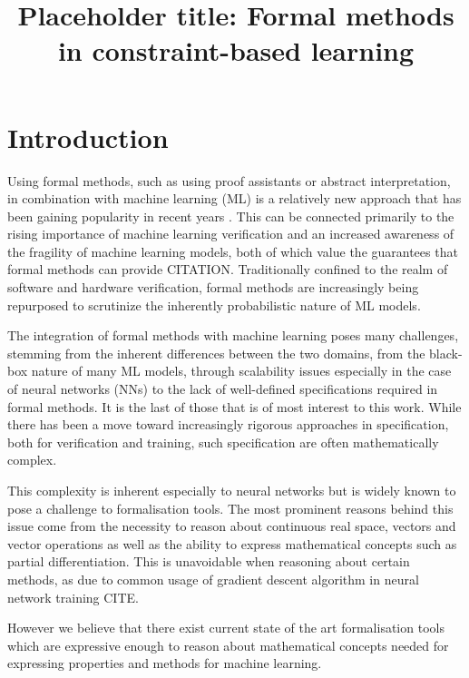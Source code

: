\documentclass[a4paper,10pt]{article}
\title{Placeholder title: Formal methods in constraint-based learning}
\author{}
\begin{document}
\maketitle

\begin{abstract}
\end{abstract}

\section{Introduction}

Using formal methods, such as using proof assistants or abstract interpretation, in combination with machine learning (ML) is a relatively new approach that has been gaining popularity in recent years \cite{urban2021review,9842406}. 
This can be connected primarily to the rising importance of machine learning verification and an increased awareness of the fragility of machine learning models, both of which value the guarantees that formal methods can provide CITATION.
Traditionally confined to the realm of software and hardware verification, formal methods are increasingly being repurposed to scrutinize the inherently probabilistic nature of ML models.

The integration of formal methods with machine learning poses many challenges, stemming from the inherent differences between the two domains, from the black-box nature of many ML models, through scalability issues especially in the case of neural networks (NNs) to the lack of well-defined specifications required in formal methods. It is the last of those that is of most interest to this work. While there has been a move toward increasingly rigorous approaches in specification, both for verification and training, such specification are often mathematically complex. 

This complexity is inherent especially to neural networks but is widely known to pose a challenge to formalisation tools. The most prominent reasons behind this issue come from the necessity to reason about continuous real space, vectors and vector operations as well as the ability to express mathematical concepts such as partial differentiation. This is unavoidable when reasoning about certain methods, as due to common usage of gradient descent algorithm in neural network training CITE.

However we believe that there exist current state of the art formalisation tools which are expressive enough to reason about mathematical concepts needed for expressing properties and methods for machine learning.
\end{document}
